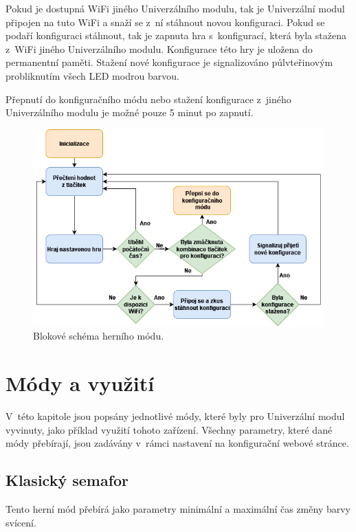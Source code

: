 Pokud je dostupná WiFi jiného Univerzálního modulu, tak je Univerzální modul připojen na tuto WiFi a snaží se z~ní stáhnout novou konfiguraci. Pokud se podaří konfiguraci stáhnout, tak je zapnuta hra s~konfigurací,
která byla stažena z~WiFi jiného Univerzálního modulu. Konfigurace této hry je uložena do permanentní paměti. Stažení nové konfigurace je signalizováno půlvteřinovým probliknutím všech LED modrou barvou. 

Přepnutí do konfiguračního módu nebo stažení konfigurace z~jiného Univerzálního modulu je možné pouze 5 minut po zapnutí. 

\begin{figure}[!h]
  \begin{center}
    \includegraphics[scale=0.65]{obrazky/blokove_schema_modu_PLAY.png}
  \end{center}
  \caption[Blokové schéma herního módu]{Blokové schéma herního módu.}
\end{figure}

\chapter{Módy a využití}
V~této kapitole jsou popsány jednotlivé módy, které byly pro Univerzální modul vyvinuty, jako příklad využití tohoto zařízení. Všechny parametry, které dané módy přebírají, jsou zadávány 
v~rámci nastavení na konfigurační webové stránce.

\section{Klasický semafor}
Tento herní mód přebírá jako parametry minimální a maximální čas změny barvy svícení. 


